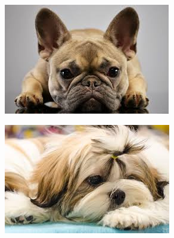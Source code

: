     \begin{figure}[htp]
         \centering
         \begin{subfigure}[b]{0.3\textwidth}
             \centering
             \includegraphics[width=\textwidth]{Figuras/buldog}
             \caption{}
             \label{fig:a}
         \end{subfigure}
         \hfill
         \begin{subfigure}[b]{0.3\textwidth}
             \centering
             \includegraphics[width=\textwidth]{Figuras/shih_tzu}
             \caption{}
             \label{fig:b}
         \end{subfigure}
         \hfill
         \begin{subfigure}[b]{0.3\textwidth}
             \centering

\end{subfigure}
\end{figure}
